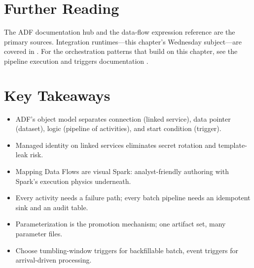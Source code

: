 \section{Further Reading}
The ADF documentation hub \cite{microsoft2025adf} and the data-flow expression reference \cite{microsoft2025adfDataFlowFunctions} are the primary sources. Integration runtimes---this chapter's Wednesday subject---are covered in \cite{microsoft2025adfIR}. For the orchestration patterns that build on this chapter, see the pipeline execution and triggers documentation \cite{microsoft2025adfTriggers}.

\section*{Key Takeaways}
\begin{itemize}
    \item ADF's object model separates connection (linked service), data pointer (dataset), logic (pipeline of activities), and start condition (trigger).
    \item Managed identity on linked services eliminates secret rotation and template-leak risk.
    \item Mapping Data Flows are visual Spark: analyst-friendly authoring with Spark's execution physics underneath.
    \item Every activity needs a failure path; every batch pipeline needs an idempotent sink and an audit table.
    \item Parameterization is the promotion mechanism; one artifact set, many parameter files.
    \item Choose tumbling-window triggers for backfillable batch, event triggers for arrival-driven processing.
\end{itemize}

